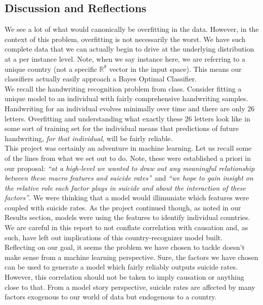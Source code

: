 \documentclass{article}
\begin{document}
\begin{multicols}{2}
\section{Discussion and Reflections}

We see a lot of what would canonically be overfitting in the data. However, in the context of this problem, overfitting is not necessarily the worst. We have such complete data that we can actually begin to drive at the underlying distribution at a per instance level. Note, when we say instance here, we are referring to a unique country (not a specific $\mathbb{R}^8$ vector in the input space). This means our classifiers actually easily approach a Bayes Optimal Classifier. \\
We recall the handwriting recognition problem from class. Consider fitting a unique model to an individual with fairly comprehensive handwriting samples. Handwriting for an individual evolves minimally over time and there are only 26 letters. Overfitting and understanding what exactly these 26 letters look like in some sort of training set for the individual means that predictions of future handwriting, \textit{for that individual}, will be fairly reliable. \\
This project was certainly an adventure in machine learning. Let us recall some of the lines from what we set out to do. Note, these were established a priori in our proposal: \textit{``at a high-level we wanted to draw out any meaningful relationship between these macro features and suicide rates'}' and \textit{``we hope to gain insight on the
relative role each factor plays in suicide and about the interaction of these factors''}. We were thinking that a model would illimuniate which features were coupled with suicide rates. As the project continued though, as noted in our Results section, models were using the features to identify individual countries. We are careful in this report to not conflate correlation with causation and, as such, have left out implications of this country-recognizer model built. \\
Reflecting on our goal, it seems the problem we have chosen to tackle doesn't make sense from a machine learning perspective. Sure, the factors we have chosen can be used to generate a model which fairly reliably outputs suicide rates. However, this correlation should not be taken to imply causation or anything close to that. From a model story perspective, suicide rates are affected by many factors exogenous to our world of data but endogenous to a country. \\

\end{multicols}
\end{document}
